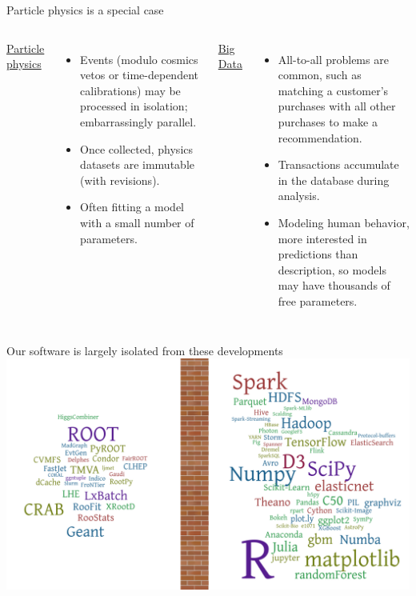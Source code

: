 \documentclass[aspectratio=169]{beamer}
\begin{document}
\begin{frame}{Particle physics is a special case}
\vspace{-0.5 cm}
\begin{columns}[t]
\begin{center}
\underline{\Large Particle physics}
\end{center}

\begin{itemize}
\item Events (modulo cosmics vetos or time-dependent calibrations) may be processed in isolation; embarrassingly parallel.

\item<2-> Once collected, physics datasets are immutable (with revisions).

\item<3-> Often fitting a model with a small number of parameters.

\end{itemize}

\begin{center}
\underline{\Large Big Data}
\end{center}

\begin{itemize}
\item All-to-all problems are common, such as matching a customer's purchases with all other purchases to make a recommendation.

\item<2-> Transactions accumulate in the database during analysis.

\item<3-> Modeling human behavior, more interested in predictions than description, so models may have thousands of free parameters.

\end{itemize}

\end{columns}
\end{frame}

\begin{frame}{Our software is largely isolated from these developments}
\vspace{0.17 cm}
\includegraphics[width=\linewidth]{separation-2.png}
\end{frame}
\end{document}
